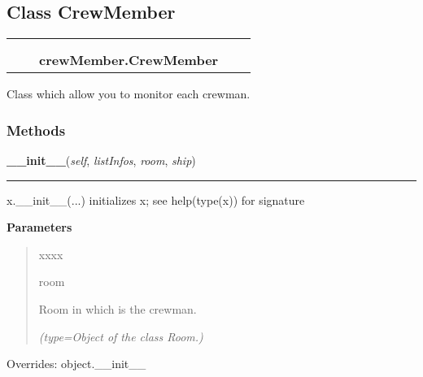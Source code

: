 \subsection{Class CrewMember}

    \label{crewMember:CrewMember}
\begin{tabular}{cccccc}
\multicolumn{2}{r}{\settowidth{\BCL}{object}\multirow{2}{\BCL}{object}}
&&
  \\\cline{3-3}
  &&\multicolumn{1}{c|}{}
&&
  \\
&&\multicolumn{2}{l}{\textbf{crewMember.CrewMember}}
\end{tabular}

Class which allow you to monitor each crewman.



  \subsubsection{Methods}

    \vspace{0.5ex}

\hspace{.8\funcindent}\begin{boxedminipage}{\funcwidth}

    \raggedright \textbf{\_\_init\_\_}(\textit{self}, \textit{listInfos}, \textit{room}, \textit{ship})

    \vspace{-1.5ex}

    \rule{\textwidth}{0.5\fboxrule}
\setlength{\parskip}{2ex}
    x.\_\_init\_\_(...) initializes x; see help(type(x)) for signature

\setlength{\parskip}{1ex}
      \textbf{Parameters}
      \vspace{-1ex}

      \begin{quote}
        \begin{Ventry}{xxxx}

          \item[room]

          Room in which is the crewman.

            {\it (type=Object of the class Room.)}

        \end{Ventry}

      \end{quote}

      Overrides: object.\_\_init\_\_

    \end{boxedminipage}

